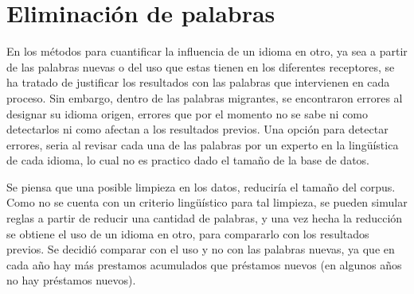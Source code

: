 \chapter{Eliminación de palabras}

En los métodos para cuantificar la influencia de un idioma en otro, ya sea a
partir de las palabras nuevas o del uso que estas tienen en los diferentes
receptores, se ha tratado de justificar los resultados con las palabras que
intervienen en cada proceso. Sin embargo, dentro de las palabras migrantes, se encontraron errores al designar su idioma origen, errores que por el momento no se sabe ni como detectarlos ni como afectan a los resultados previos.  Una opción para detectar errores, seria al revisar cada una de las palabras por un experto en la lingüística de cada idioma, lo cual no es practico dado el tamaño de la base de datos.

Se piensa que una posible limpieza en los datos, reduciría el tamaño del corpus. Como no se cuenta con un criterio lingüístico para tal limpieza, se pueden simular reglas a partir de reducir una cantidad de palabras, y una vez hecha la reducción se obtiene el uso de un idioma en otro, para compararlo con los resultados previos. Se decidió comparar con el uso y no con las palabras nuevas, ya que en cada año hay más prestamos acumulados que préstamos nuevos (en algunos años no hay préstamos nuevos).

 


